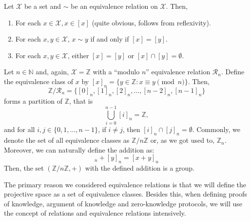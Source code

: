 \documentclass[../lecture-notes.tex]{subfiles}
\begin{document}
\begin{lemma}
    Let $\mathcal{X}$ be a set and $\sim$ be an equivalence relation on $\mathcal{X}$. Then,
    \begin{enumerate}
        \item For each $x \in \mathcal{X}, x \in [x]$ (quite obvious, follows from reflexivity).
        \item For each $x,y \in \mathcal{X}$, $x \sim y$ if and only if $[x] = [y]$.
        \item For each $x,y \in \mathcal{X}$, either $[x]=[y]$ or $[x] \cap [y] = \emptyset$.
    \end{enumerate}
\end{lemma}

\vspace{-6mm}

\begin{example}
    Let $n \in \mathbb{N}$ and, again, $\mathcal{X} = \mathbb{Z}$ with a ``modulo $n$'' equivalence relation $\mathcal{R}_n$. Define the equivalence class of $x$ by $[x]_n = \{y \in \mathbb{Z}: x \equiv y \pmod{n}\}$. Then, 
    \begin{equation*}
        \mathbb{Z}/\mathcal{R}_n = \{[0]_n, [1]_n, [2]_n, \dots, [n-2]_n, [n-1]_n\}
    \end{equation*}
    forms a partition of $\mathbb{Z}$, that is 
    \begin{equation*}
        \bigcup_{i=0}^{n-1} [i]_n = \mathbb{Z},
    \end{equation*}
    and for all $i,j \in \{0,1,\dots,n-1\}$, if $i \neq j$, then $[i]_n \cap [j]_n = \emptyset$. Commonly, we denote the set of all equivalence classes as $\mathbb{Z}/n\mathbb{Z}$ or, as we got used to, $\mathbb{Z}_n$. Moreover, we can naturally define the addition as:
    \begin{equation*}
        [x]_n + [y]_n = [x+y]_n
    \end{equation*}
    Then, the set $(\mathbb{Z}/n\mathbb{Z},+)$ with the defined addition is a group.
\end{example}

\vspace{-1mm}

The primary reason we considered equivalence relations is that we will define the projective space as a set of equivalence classes. Besides this, when defining proofs of knowledge, argument of knowledge and zero-knowledge protocols, we will use the concept of relations and equivalence relations intensively.
\end{document}

